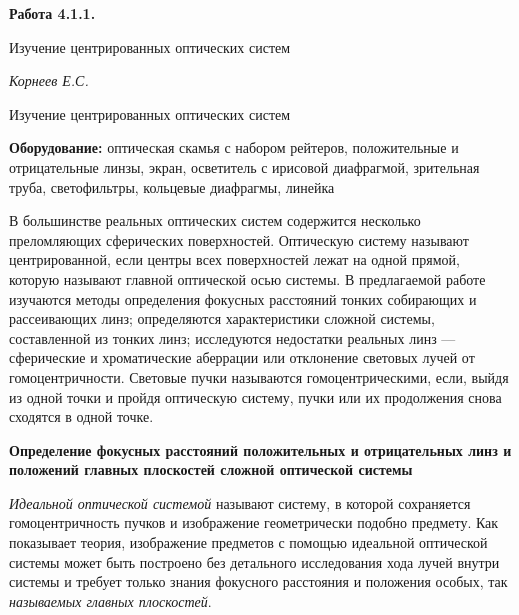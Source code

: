 \documentclass[14pt]{article}
\begin{document}
\begin{titlepage}
	\begin{center}
		\fontsize{18pt}{20pt}\selectfont
		\textbf{Работа 4.1.1.}	
	
		\vspace{5cm}
		\fontsize{24pt}{25pt}\selectfont
		Изучение центрированных оптических систем
	\end{center}
	\begin{flushright}
		\fontsize{18pt}{20pt}\selectfont
		\vspace{14cm}
		\hspace{-3cm}
		\textit{Корнеев Е.С.}
	\end{flushright}		
\end{titlepage}

\begin{center}
	\fontsize{16pt}{18pt}\selectfont	
	Изучение центрированных оптических систем
\end{center}


\fontsize{14pt}{16pt}\selectfont
\vspace{1cm}
\textbf{Оборудование:} оптическая скамья с набором рейтеров, положительные
и отрицательные линзы, экран, осветитель с ирисовой
диафрагмой, зрительная труба, светофильтры, кольцевые диафрагмы,
линейка

\vspace{1cm}В большинстве реальных оптических систем содержится несколько
преломляющих сферических поверхностей. Оптическую систему называют
центрированной, если центры всех поверхностей лежат на одной
прямой, которую называют главной оптической осью системы.
В предлагаемой работе изучаются методы определения фокусных
расстояний тонких собирающих и рассеивающих линз; определяются характеристики
сложной системы, составленной из тонких линз; исследуются
недостатки реальных линз — сферические и хроматические аберрации
или отклонение световых лучей от гомоцентричности. Световые
пучки называются гомоцентрическими, если, выйдя из одной точки и
пройдя оптическую систему, пучки или их продолжения снова сходятся
в одной точке.

\vspace{1cm}
\textbf{Определение фокусных расстояний
положительных и отрицательных линз
и положений главных плоскостей сложной
оптической системы} 

\textsl{Идеальной оптической системой} называют систему, в которой сохраняется
гомоцентричность пучков и изображение геометрически подобно
предмету. Как показывает теория, изображение предметов с помощью
идеальной оптической системы может быть построено без детального
исследования хода лучей внутри системы и требует только знания фокусного
расстояния и положения особых, так \textsl{называемых главных плоскостей}.
\end{document}
